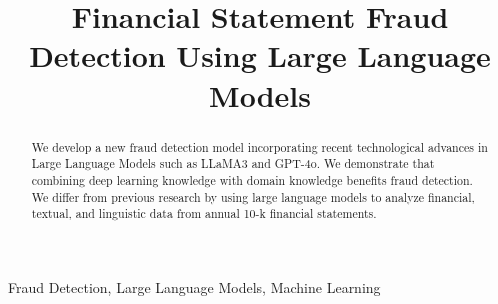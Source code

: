 \documentclass[conference]{IEEEtran}
\begin{document}
\title{Financial Statement Fraud Detection Using Large Language Models}

\author{\and
{}
\and
{}
\and
}

\maketitle

\begin{abstract} We develop a new fraud detection model incorporating recent technological advances in Large Language Models such as LLaMA3 and GPT-4o. We demonstrate that combining deep learning knowledge with domain knowledge benefits fraud detection. We differ from previous research by using large language models to analyze financial, textual, and linguistic data from annual 10-k financial statements.
\end{abstract}

\begin{IEEEkeywords}
Fraud Detection, Large Language Models, Machine Learning
\end{IEEEkeywords}
\end{document}
